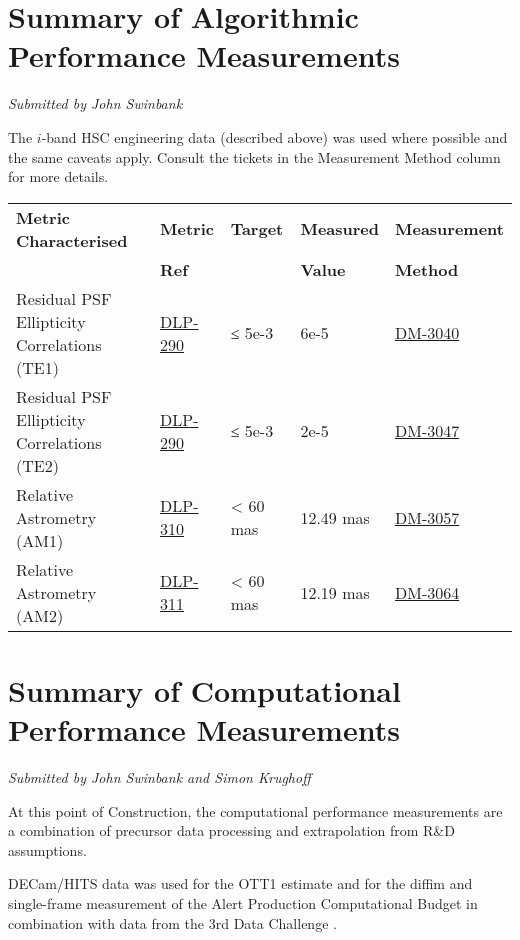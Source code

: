 \documentclass[DM,toc]{lsstdoc}
\begin{document}
\section{Summary of Algorithmic Performance
Measurements}\label{summary-of-algorithmic-performance-measurements}

\emph{Submitted by John Swinbank}

The $i$-band HSC engineering data (described above) was used where
possible and the same caveats apply. Consult the tickets in the
Measurement Method column for more details.

\begin{small}
\begin{longtable}[]{@{}lllll@{}}
\toprule
\textbf{Metric Characterised} & \textbf{Metric} & \textbf{Target} &
\textbf{Measured} & \textbf{Measurement}\tabularnewline
 & \textbf{Ref} &  &
\textbf{Value} & \textbf{Method}\tabularnewline
\midrule
\endhead
Residual PSF Ellipticity Correlations (TE1) &
\href{https://jira.lsstcorp.org/browse/DLP-290}{DLP-290} & ≤ 5e-3 & 6e-5
&
\href{https://jira.lsstcorp.org/browse/DM-3040}{DM-3040}\tabularnewline
Residual PSF Ellipticity Correlations (TE2) &
\href{https://jira.lsstcorp.org/browse/DLP-290}{DLP-290} & ≤ 5e-3 & 2e-5
& \href{https://jira.lsstcorp.org/browse/DM-3047}{DM-3047
}\tabularnewline
Relative Astrometry (AM1) &
\href{https://jira.lsstcorp.org/browse/DLP-310}{DLP-310} & \textless{}
60 mas & 12.49 mas &
\href{https://jira.lsstcorp.org/browse/DM-3057}{DM-3057}\tabularnewline
Relative Astrometry (AM2) &
\href{https://jira.lsstcorp.org/browse/DLP-311}{DLP-311} & \textless{}
60 mas & 12.19 mas &
\href{https://jira.lsstcorp.org/browse/DM-3064}{DM-3064}\tabularnewline
\bottomrule
\end{longtable}
\end{small}

\section{Summary of Computational Performance
Measurements}\label{summary-of-computational-performance-measurements}

\emph{Submitted by John Swinbank and
Simon Krughoff}

At this point of Construction, the computational performance
measurements are a combination of precursor data processing and
extrapolation from R\&D assumptions.

DECam/HITS data was used for the OTT1 estimate and for the diffim and
single-frame measurement of the Alert Production Computational Budget in
combination with data from the
3rd Data Challenge .
\end{document}
